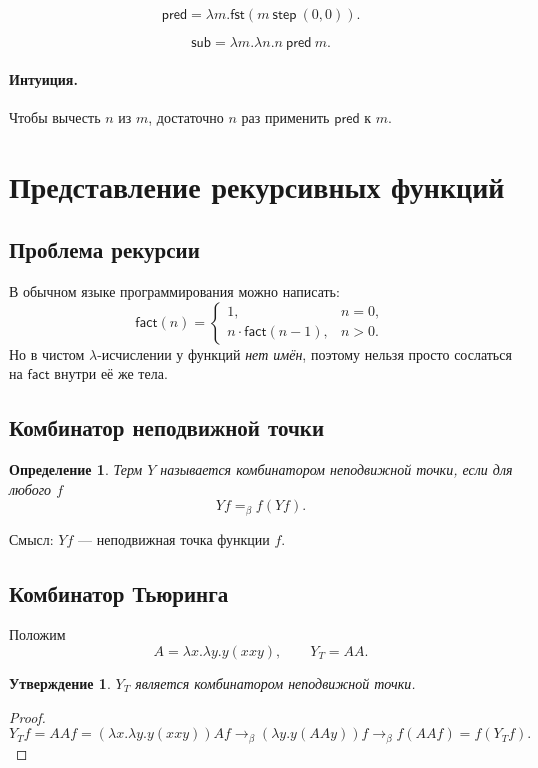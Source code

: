 \documentclass[12pt,a4paper]{article}
\newtheorem{definition}{Определение}
\newtheorem{proposition}{Утверждение}
\theoremstyle{remark}
\begin{document}
\[
\mathsf{pred}
=
\lambda m.\mathsf{fst}(m\ \mathsf{step}\ (0,0)).
\]

\[
\mathsf{sub}
=
\lambda m.\lambda n.n\ \mathsf{pred}\ m.
\]

\paragraph{Интуиция.}
Чтобы вычесть $n$ из $m$, достаточно $n$ раз применить $\mathsf{pred}$ к $m$.

\section{Представление рекурсивных функций}

\subsection{Проблема рекурсии}

В обычном языке программирования можно написать:
\[
\mathsf{fact}(n)=
\begin{cases}
1,& n=0,\\
n\cdot \mathsf{fact}(n-1),& n>0.
\end{cases}
\]
Но в чистом $\lambda$-исчислении у функций \emph{нет имён}, поэтому нельзя просто сослаться на $\mathsf{fact}$ внутри её же тела.

\subsection{Комбинатор неподвижной точки}

\begin{definition}
Терм $Y$ называется \emph{комбинатором неподвижной точки}, если для любого $f$
\[
Yf =_\beta f(Yf).
\]
\end{definition}

Смысл: $Yf$ --- неподвижная точка функции $f$.

\subsection{Комбинатор Тьюринга}

Положим
\[
A=\lambda x.\lambda y.y(xxy),
\qquad
Y_T=AA.
\]

\begin{proposition}
$Y_T$ является комбинатором неподвижной точки.
\end{proposition}

\begin{proof}
\[
Y_Tf
=
AAf
=
(\lambda x.\lambda y.y(xxy))Af
\to_\beta
(\lambda y.y(AAy))f
\to_\beta
f(AAf)
=
f(Y_Tf).
\]
\end{proof}
\end{document}
